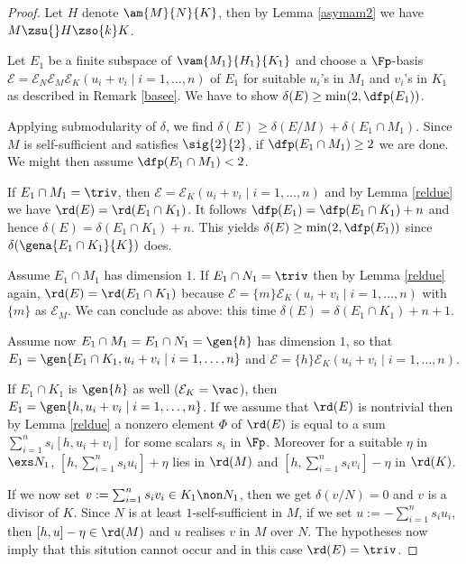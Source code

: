 \begin{proof}
Let $H$ denote $\am{M}{N}{K}$, then by Lemma \ref{asymam2} we have $M\zsu{}H\zso{k}K$.

Let $E_{1}$ be a finite subspace of $\vam{M_{1}}{H_{1}}{K_{1}}$ and choose a $\Fp$-basis
$\mathcal{E}=\mathcal{E}_{N}\mathcal{E}_{M}\mathcal{E}_{K}(u_{i}+v_{i}\mid i=1,\dots,n)$ of $E_{1}$ for suitable
$u_{i}$'s in $M_{1}$ and $v_{i}$'s in $K_{1}$ as described in Remark \ref{basee}.
We have to show $\delta(E)\geq\min(2,\dfp(E_{1}))$.

Applying submodularity  of $\delta$, we find $\delta(E)\geq\delta(E/ M)+\delta(E_{1}\cap M_{1})$.
Since $M$ is self-sufficient and satisfies $\sig{2}{2}$, if $\dfp(E_{1}\cap M_{1})\geq2$ we are done.
We might then assume $\dfp(E_{1}\cap M_{1})<2$.

\smallskip
If $E_{1}\cap M_{1}=\triv$,
then $\mathcal{E}=\mathcal{E}_{K}(u_{i}+v_{i}\mid i=1,\dots, n)$ and by Lemma \ref{reldue} we have $\rd(E)=
\rd(E_{1}\cap K_{1})$. It follows $\dfp(E_{1})=\dfp(E_{1}\cap K_{1})+n$ and hence $\delta(E)=\delta(E_{1}\cap K_{1})+n$.
This yields $\delta(E)\geq\min(2,\dfp(E_{1}))$ since $\delta(\gena{E_{1}\cap K_{1}}{K})$ does.

\smallskip
Assume $E_{1}\cap M_{1}$ %
has dimension $1$. If $E_{1}\cap N_{1}=\triv$ then by Lemma \ref{reldue} again, $\rd(E)=\rd(E_{1}\cap
K_{1})$ because $\mathcal{E}=\{m\}\mathcal{E}_{K}(u_{i}+v_{i}\mid i=1,\dots,n)$ with $\{m\}$ as $\mathcal{E}_{M}$.
We can conclude as above: this time $\delta(E)=\delta(E_{1}\cap K_{1})+n+1$.

\smallskip
Assume now $E_{1}\cap M_{1}=E_{1}\cap N_{1}=\gen{h}$ has dimension $1$, so that
$E_{1}=\gen{E_{1}\cap K_{1},u_{i}+v_{i}\mid i=1,\dots,n}$ and $\mathcal{E}=\{h\}\mathcal{E}_{K}(u_{i}+v_{i}\mid i=1,\dots,n)$.

If $E_{1}\cap K_{1}$ is $\gen{h}$ as well ($\mathcal{E}_{K}=\vac$), then $E_{1}=\gen{h,u_{i}+v_{i}\mid i=1,\dots,n}$. If we assume that 
$\rd(E)$ is nontrivial %
then by Lemma \ref{reldue} a nonzero element
$\Phi$ of $\rd(E)$ is equal to a sum $\sum_{i=1}^{n}s_{i}[h,u_{i}+v_{i}]$ for some scalars $s_{i}$ in $\Fp$. Moreover for a suitable
$\eta$ in $\exs N_{1}$, $[h,\sum_{i=1}^{n}s_{i}u_{i}]+\eta$ lies in $\rd(M)$ and $[h,\sum_{i=1}^{n}s_{i}v_{i}]-\eta$ in $\rd(K)$.

If we now set $v:=\sum_{i=1}^{n}s_{i}v_{i}\in K_{1}\non N_{1}$, then we get $\delta(v/N)=0$ and
$v$ is a divisor of $K$. Since $N$ is at least $1$-self-sufficient in $M$, if we set $u:=-\sum_{i=1}^{n}s_{i}u_{i}$,
then $[h,u]-\eta\in\rd(M)$ and $u$ realises $v$ in $M$ over $N$. The hypotheses now imply that
this sitution cannot occur and in this case $\rd(E)=\triv$.


\end{proof}
